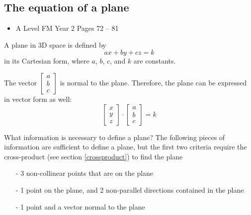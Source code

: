 \documentclass[11pt, a4paper]{article}
\begin{document}
\subsection{The equation of a plane}
\begin{itemize}
\item A Level FM Year 2 \hspace{1cm} \phantom{AS /} Pages 72 -- 81
\end{itemize} \par
A plane in 3D space is defined by
\begin{equation*}
ax+by+cz=k
\end{equation*}
in its Cartesian form, where $a$, $b$, $c$, and $k$ are constants. \newline \par
The vector $\begin{bmatrix}a \\ b \\ c\end{bmatrix}$ is normal to the plane. Therefore, the plane can be expressed in vector form as well:
\begin{equation*}
\begin{bmatrix} x \\ y \\ z \end{bmatrix}\cdot\begin{bmatrix} a \\ b \\ c \end{bmatrix}=k
\end{equation*}

What information is necessary to define a plane? The following pieces of information are sufficient to define a plane, but the first two criteria require the cross-product (see section \ref{crossproduct}) to find the plane
\begin{itemize}
\item[-]3 non-collinear points that are on the plane
\item[-]1 point on the plane, and 2 non-parallel directions contained in the plane
\item[-]1 point and a vector normal to the plane
\end{itemize}
\vspace{0.5cm}
\end{document}
